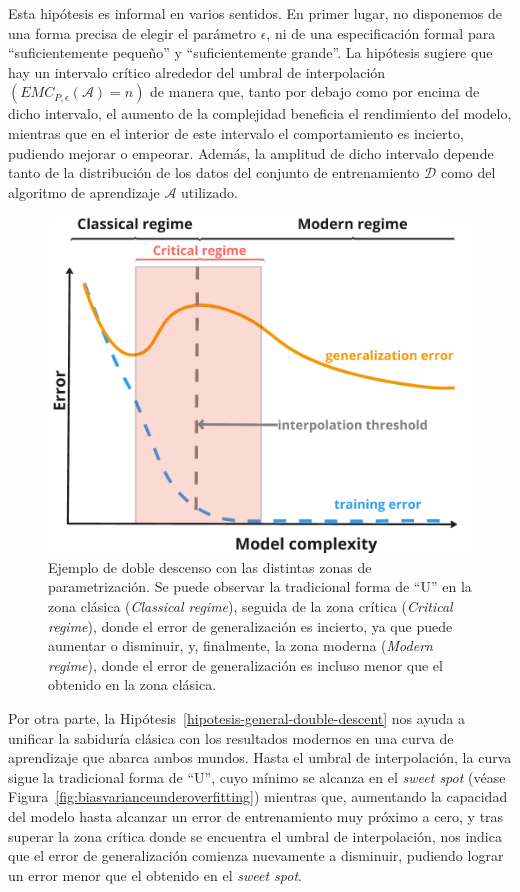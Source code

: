 Esta hipótesis es informal en varios sentidos. En primer lugar, no disponemos de una forma precisa de elegir el parámetro $\epsilon$, ni de una especificación formal para ``suficientemente pequeño'' y ``suficientemente grande''. La hipótesis sugiere que hay un intervalo crítico alrededor del umbral de interpolación $(EMC_{P, \epsilon}(\mathcal{A}) = n)$ de manera que, tanto por debajo como por encima de dicho intervalo, el aumento de la complejidad beneficia el rendimiento del modelo, mientras que en el interior de este intervalo el comportamiento es incierto, pudiendo mejorar o empeorar. Además, la amplitud de dicho intervalo depende tanto de la distribución de los datos del conjunto de entrenamiento $\mathcal{D}$ como del algoritmo de aprendizaje $\mathcal{A}$ utilizado.

\begin{figure}[h]
    \centering
    \includegraphics[width=0.6\linewidth]{img/planteamiento-teorico-dd.png}
    \caption[Ejemplo de doble descenso con las distintas zonas de parametrización.]{Ejemplo de doble descenso con las distintas zonas de parametrización. Se puede observar la tradicional forma de ``U'' en la zona clásica (\textit{Classical regime}), seguida de la zona crítica (\textit{Critical regime}), donde el error de generalización es incierto, ya que puede aumentar o disminuir, y, finalmente, la zona moderna (\textit{Modern regime}), donde el error de generalización es incluso menor que el obtenido en la zona clásica.}\label{fig:planteamiento-teorico-dd.png}
\end{figure}

Por otra parte, la Hipótesis~\ref{hipotesis-general-double-descent} nos ayuda a unificar la sabiduría clásica con los resultados modernos en una curva de aprendizaje que abarca ambos mundos. Hasta el umbral de interpolación, la curva sigue la tradicional forma de ``U'', cuyo mínimo se alcanza en el \textit{sweet spot} (véase Figura~\ref{fig:biasvarianceunderoverfitting}) mientras que, aumentando la capacidad del modelo hasta alcanzar un error de entrenamiento muy próximo a cero, y tras superar la zona crítica donde se encuentra el umbral de interpolación, nos indica que el error de generalización comienza nuevamente a disminuir, pudiendo lograr un error menor que el obtenido en el \textit{sweet spot}.

